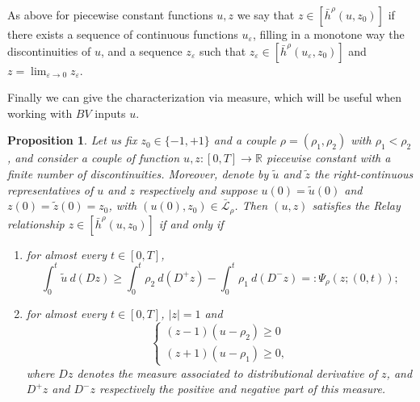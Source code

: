 \documentclass[12pt]{article}
\newcommand{\R}{\mathbb{R}}
\newcommand{\p}{\rho}
\newcommand{\1}{\mathds{1}}
\newtheorem{prop}[teo]{Proposition}
\theoremstyle{definition}
\newtheorem{rmk}[teo]{Remark}
\begin{document}
As above for piecewise constant functions $u,z$ we say that $z\in [\bar{h}^\p(u,z_0)]$ if there exists a sequence of continuous functions $u_\varepsilon$, filling in a monotone way the discontinuities of $u$, and a sequence $z_\varepsilon$ such that $z_\varepsilon \in [\bar{h}^\p(u_\varepsilon,z_0)]$ and $z=\lim_{\varepsilon\to0} z_\varepsilon$.\par Finally we can give the characterization via measure, which will be useful when working with $BV$ inputs $u$.
\begin{prop} \label{prop: Relayweak}
    Let us fix $z_0 \in \{-1,+1\}$ and a couple $\p=(\p_1,\p_2)$ with $\p_1<\p_2$, and consider a couple of function $u,z: [0,T] \to \R$ piecewise constant with a finite number of discontinuities. Moreover, denote by $\tilde{u}$ and $\tilde{z}$ the right-continuous representatives of $u$ and $z$ respectively and suppose $u(0)=\tilde{u}(0)$ and $z(0)=\tilde{z}(0)=z_0$, with $(u(0),z_0)\in\bar{\mathcal L}_\rho$. Then $(u,z)$ satisfies the Relay relationship $z\in[\bar{h}^{\p}(u,z_0)]$ if and only if \begin{enumerate}[1)]
        \item\label{prop1} for almost every $t\in [0,T]$, \begin{equation}\label{eq: weakhis}
            \int_{0}^{t} \tilde{u} ~d(Dz)\geq \int_{0}^{t} \p_2 ~d(D^+z)-\int_{0}^{t} \p_1 ~d(D^-z)=: \Psi_\p(z;(0,t));
        \end{equation}
        \item\label{prop2} for almost every $t\in [0,T]$, $|z|=1$ and \begin{equation} 
            \begin{cases}
                (z-1)(u-\p_2) \geq 0 \\
                (z+1)(u-\p_1)\geq 0,
            \end{cases}
        \end{equation}
        where $Dz$ denotes the measure associated to distributional derivative of $z$, and $D^+z$ and $D^-z$ respectively the positive and negative part of this measure.
    \end{enumerate}
\end{prop}
\end{document}
